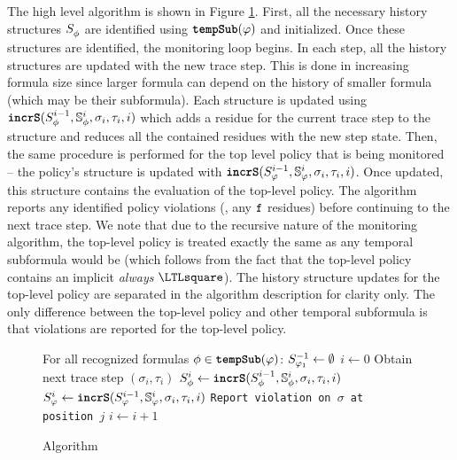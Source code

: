 The high level algorithm \monitor is shown in Figure \ref{fig:algorithm}. 
%
First, all the necessary history structures $\histst[\policyv]{ }$ are identified using $\tempSub(\policy)$ and initialized. 
Once these structures are identified, the monitoring loop begins.
%
In each step, all the history structures are updated with the new trace step. 
This is done in increasing formula size since larger formula can depend on the history of smaller formula (which may be their subformula).
%
Each structure is updated using $\incrS(\histst[\policyv]{i-1},\histSt[\policyv]{i}, \sigma_i, \tau_i, i)$ which adds a residue for the current trace step to the structure and reduces all the contained residues with the new step state. 
Then, the same procedure is performed for the top level policy that is being monitored -- the policy's structure is updated with $\incrS(\histst{i-1},\histSt{i},\sigma_i,\tau_i, i)$.
Once updated, this structure contains the evaluation of the top-level policy. The algorithm reports any identified policy violations (\ie, any $\false$ residues) before continuing to the next trace step.
%
We note that due to the recursive nature of the monitoring algorithm, the top-level policy is treated exactly the same as any temporal subformula would be (which follows from the fact that the top-level policy contains an implicit \emph{always} $\henceforth$). 
The history structure updates for the top-level policy are separated in the algorithm description for clarity only.
The only difference between the top-level policy and other temporal subformula is that violations are reported for the top-level policy. 

\begin{figure}
\begin{algorithmic}[1]
\STATE For all recognized formulas $\policyv \in \tempSub(\policy)$: $\histst[\policy_1]{-1} \leftarrow \emptyset$
\STATE $i \leftarrow 0$
\LOOP
\STATE Obtain next trace step $(\sigma_i, \tau_i)$ 
	\STATE $\histst[\policyv]{i} \leftarrow \incrS(\histst[\policyv]{i-1}, \histSt[\policyv]{i}, \sigma_i, \tau_i, i)$
\ENDFOR
\STATE $\histst{i} \leftarrow \incrS(\histst{i-1}, \histSt{i}, \sigma_i, \tau_i, i)$
\STATE \texttt{Report violation on $\sigma$ at position $j$}
\ENDFOR
\STATE $i \leftarrow i + 1$
\ENDLOOP
\end{algorithmic}
\caption{\monitor Algorithm}\label{fig:algorithm}
\end{figure}

